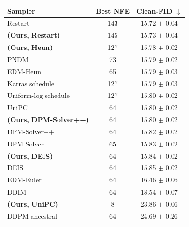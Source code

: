 \begin{tabular}{lcc}
\toprule
Sampler & Best NFE & Clean-FID $\downarrow$ \\
\midrule
Restart & 143 & 15.72 {\scriptsize $\pm$ 0.04} \\
\textbf{(Ours, Restart)} & 145 & 15.73 {\scriptsize $\pm$ 0.04} \\
\textbf{(Ours, Heun)} & 127 & 15.78 {\scriptsize $\pm$ 0.02} \\
PNDM & 73 & 15.79 {\scriptsize $\pm$ 0.02} \\
EDM-Heun & 65 & 15.79 {\scriptsize $\pm$ 0.03} \\
Karras schedule & 127 & 15.79 {\scriptsize $\pm$ 0.03} \\
Uniform-log schedule & 127 & 15.80 {\scriptsize $\pm$ 0.02} \\
UniPC & 64 & 15.80 {\scriptsize $\pm$ 0.02} \\
\textbf{(Ours, DPM-Solver++)} & 64 & 15.80 {\scriptsize $\pm$ 0.02} \\
DPM-Solver++ & 64 & 15.82 {\scriptsize $\pm$ 0.02} \\
DPM-Solver & 65 & 15.83 {\scriptsize $\pm$ 0.02} \\
\textbf{(Ours, DEIS)} & 64 & 15.84 {\scriptsize $\pm$ 0.02} \\
DEIS & 64 & 15.85 {\scriptsize $\pm$ 0.02} \\
EDM-Euler & 64 & 16.46 {\scriptsize $\pm$ 0.06} \\
DDIM & 64 & 18.54 {\scriptsize $\pm$ 0.07} \\
\textbf{(Ours, UniPC)} & 8 & 23.86 {\scriptsize $\pm$ 0.06} \\
DDPM ancestral & 64 & 24.69 {\scriptsize $\pm$ 0.26} \\
\bottomrule
\end{tabular}
